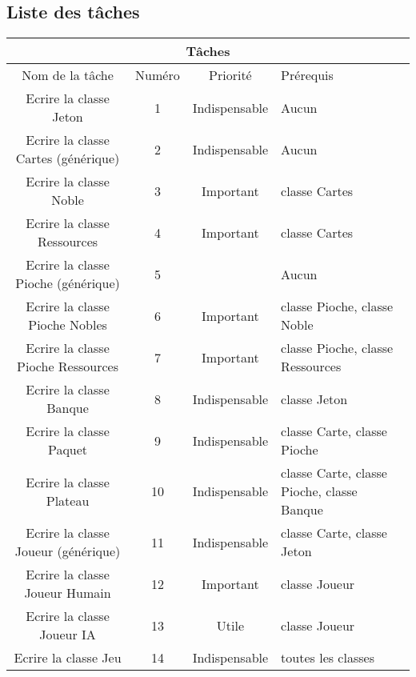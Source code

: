 \documentclass[12pt, letterpaper]{article}
\begin{document}
\subsection{Liste des tâches}
\begin{center}
\begin{tabular}{ |c||c||c|p{5cm}| }
\hline
\multicolumn{4}{|c|}{Tâches} \\
\hline
Nom de la tâche & Numéro & Priorité & Prérequis\\
\hline
\hline
Ecrire la classe Jeton & 1 & \cellcolor[HTML]{ee7d7d} Indispensable & Aucun\\
\hline
Ecrire la classe Cartes (générique) & 2 & \cellcolor[HTML]{ee7d7d} Indispensable & Aucun\\
\hline
Ecrire la classe Noble & 3 & \cellcolor[HTML]{eeda7d} Important & classe Cartes\\
\hline
Ecrire la classe Ressources & 4 & \cellcolor[HTML]{eeda7d} Important & classe Cartes\\
\hline
Ecrire la classe Pioche (générique) & 5 & \cellcolor[HTML]{ee7d7d} & Aucun\\
\hline
Ecrire la classe Pioche Nobles & 6 & \cellcolor[HTML]{eeda7d} Important & classe Pioche, classe Noble\\
\hline
Ecrire la classe Pioche Ressources & 7 & \cellcolor[HTML]{eeda7d} Important & classe Pioche, classe Ressources\\
\hline
Ecrire la classe Banque & 8 & \cellcolor[HTML]{ee7d7d} Indispensable & classe Jeton\\
\hline
Ecrire la classe Paquet &  9 & \cellcolor[HTML]{ee7d7d} Indispensable & classe Carte, classe Pioche\\
\hline
Ecrire la classe Plateau & 10 & \cellcolor[HTML]{ee7d7d} Indispensable & classe Carte, classe Pioche, classe Banque\\
\hline
Ecrire la classe Joueur (générique) & 11 & \cellcolor[HTML]{ee7d7d} Indispensable & classe Carte, classe Jeton\\
\hline
Ecrire la classe Joueur Humain & 12 & \cellcolor[HTML]{eeda7d} Important & classe Joueur\\
\hline
Ecrire la classe Joueur IA & 13 & \cellcolor[HTML]{a5ee7d} Utile & classe Joueur\\
\hline
Ecrire la classe Jeu & 14 & \cellcolor[HTML]{ee7d7d} Indispensable & toutes les classes\\
\hline
\end{tabular}
\end{center}
\end{document}
